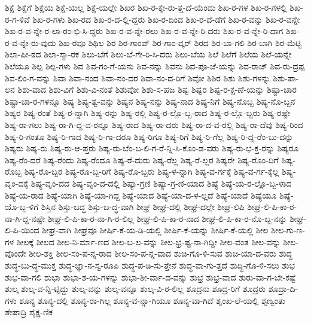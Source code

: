 {ಶಿಕ್ಷೆ
ಶಿಕ್ಷೆಗೆ
ಶಿಕ್ಷೆಯ
ಶಿಕ್ಷೆ-ಯಲ್ಲ
ಶಿಕ್ಷೆ-ಯಲ್ಲೇ
ಶಿಖರ
ಶಿಖ-ರ-ಕ್ಕೇ-ರು-ತ್ತ-ದೆ-ಯೆಂದು
ಶಿಖ-ರ-ಗಳ
ಶಿಖ-ರ-ಗಳಲ್ಲಿ
ಶಿಖ-ರ-ಗ-ಳಿವೆ
ಶಿಖ-ರ-ಗಳು
ಶಿಖ-ರದ
ಶಿಖ-ರ-ದ-ಲ್ಲಿ-ದ್ದರು
ಶಿಖ-ರ-ದಿಂದ
ಶಿಖ-ರ-ದೆ-ಡೆಗೆ
ಶಿಖ-ರ-ವನ್ನು
ಶಿಖ-ರ-ವನ್ನೇ
ಶಿಖ-ರ-ವ-ನ್ನೇ-ರ-ಲಾ-ರಂ-ಭಿ-ಸಿ-ದ್ದರು
ಶಿಖ-ರ-ವ-ನ್ನೇ-ರಲು
ಶಿಖ-ರ-ವ-ನ್ನೇ-ರಿ-ದರು
ಶಿಖ-ರ-ವ-ನ್ನೇ-ರಿ-ದಾಗ
ಶಿಖ-ರ-ವ-ನ್ನೇ-ರು-ವುದು
ಶಿಖ-ರವೂ
ಶಿಥಿಲ
ಶಿರ
ಶಿರ-ಗಾಂವ್
ಶಿರ-ಗಾಂ-ವ್ಕರ್
ಶಿರದ
ಶಿರ-ಬಾ-ಗಲಿ
ಶಿರ-ಬಾಗಿ
ಶಿರ-ಮೆಟ್ಟಿ
ಶಿಲಾ-ಪೀ-ಠದ
ಶಿಲಾ-ಸ್ಮಾ-ರಕ
ಶಿಲು-ಬೆಗೆ
ಶಿಲು-ಬೆ-ಗೇ-ರಿ-ಸಿ-ದರು
ಶಿಲು-ಬೆಯ
ಶಿಲೆ
ಶಿಲೆಗೆ
ಶಿಲೆಯ
ಶಿಲೆ-ಯನ್ನೇ
ಶಿಲೆಯೂ
ಶಿಲ್ಪ
ಶಿಲ್ಪ-ಗಳು
ಶಿವ
ಶಿವ-ಗಂ-ಗೆ-ಯನು
ಶಿವ-ನನ್ನು
ಶಿವನು
ಶಿವ-ಪೂ-ಜೆ-ಯನ್ನು
ಶಿವ-ರಾಜ್
ಶಿವ-ರು-ದ್ರಪ್ಪ
ಶಿವ-ಲಿಂ-ಗ-ವನ್ನು
ಶಿವಾ
ಶಿವಾ-ನಂದ
ಶಿವಾ-ನಂ-ದರ
ಶಿವಾ-ನಂ-ದ-ರಿಗೆ
ಶಿವೋ
ಶಿಶಿರ
ಶಿಶು
ಶಿಶು-ಗಳನ್ನು
ಶಿಶು-ಪಾ-ಲನ
ಶಿಶು-ವಾದ
ಶಿಶು-ವಿಗೆ
ಶಿಶು-ವಿ-ನಂತೆ
ಶಿಶುವೋ
ಶಿಶು-ಸ-ಹಜ
ಶಿಷ್ಟ
ಶಿಷ್ಟರ
ಶಿಷ್ಟ-ರ-ಕ್ಷ-ಣೆ-ಯನ್ನು
ಶಿಷ್ಟಾ-ಚಾರ
ಶಿಷ್ಟಾ-ಚಾ-ರ-ಗಳನ್ನೂ
ಶಿಷ್ಯ
ಶಿಷ್ಯ-ತ್ವ-ವನ್ನು
ಶಿಷ್ಯನ
ಶಿಷ್ಯ-ನನ್ನು
ಶಿಷ್ಯ-ನಾದ
ಶಿಷ್ಯ-ನಿಗೆ
ಶಿಷ್ಯ-ನೊಬ್ಬ
ಶಿಷ್ಯ-ನೊ-ಬ್ಬನ
ಶಿಷ್ಯರ
ಶಿಷ್ಯ-ರಂತೆ
ಶಿಷ್ಯ-ರ-ನ್ನಾಗಿ
ಶಿಷ್ಯ-ರನ್ನು
ಶಿಷ್ಯ-ರಲ್ಲಿ
ಶಿಷ್ಯ-ರ-ಲ್ಲೊ-ಬ್ಬ-ರಾದ
ಶಿಷ್ಯ-ರ-ಲ್ಲೊ-ಬ್ಬರು
ಶಿಷ್ಯ-ರಷ್ಟೇ
ಶಿಷ್ಯ-ರಾ-ಗಲು
ಶಿಷ್ಯ-ರಾ-ಗಿ-ದ್ದ-ವ-ರನ್ನೂ
ಶಿಷ್ಯ-ರಾದ
ಶಿಷ್ಯ-ರಾ-ದರು
ಶಿಷ್ಯ-ರಾ-ದ-ವ-ರಲ್ಲಿ
ಶಿಷ್ಯ-ರಾ-ದೆವು
ಶಿಷ್ಯ-ರಿಂದ
ಶಿಷ್ಯ-ರಿ-ಗಂತೂ
ಶಿಷ್ಯ-ರಿ-ಗಾದ
ಶಿಷ್ಯ-ರಿ-ಗಾ-ದರೂ
ಶಿಷ್ಯ-ರಿಗೂ
ಶಿಷ್ಯ-ರಿಗೆ
ಶಿಷ್ಯ-ರಿ-ಗೆಲ್ಲ
ಶಿಷ್ಯ-ರಿ-ದ್ದ-ರೆಂ-ಬು-ದನ್ನು
ಶಿಷ್ಯರು
ಶಿಷ್ಯ-ರು
ಶಿಷ್ಯ-ರು-ಆ-ಪ್ತರು
ಶಿಷ್ಯ-ರು-ಬೆಂ-ಬ-ಲಿ-ಗ-ರೆ-ನ್ನಿ-ಸಿ-ಕೊಂ-ಡ-ವರು
ಶಿಷ್ಯ-ರು-ಭ-ಕ್ತ-ರನ್ನು
ಶಿಷ್ಯರೂ
ಶಿಷ್ಯ-ರೆಂ-ದರೆ
ಶಿಷ್ಯ-ರೆಂದು
ಶಿಷ್ಯ-ರೆಂದೂ
ಶಿಷ್ಯ-ರೆ-ದುರು
ಶಿಷ್ಯ-ರೆಲ್ಲ
ಶಿಷ್ಯ-ರೆ-ಲ್ಲರ
ಶಿಷ್ಯರೇ
ಶಿಷ್ಯ-ರೊಂ-ದಿಗೆ
ಶಿಷ್ಯ-ರೊಬ್ಬ
ಶಿಷ್ಯ-ರೊ-ಬ್ಬರ
ಶಿಷ್ಯ-ರೊ-ಬ್ಬ-ರಿಗೆ
ಶಿಷ್ಯ-ರೊ-ಬ್ಬರು
ಶಿಷ್ಯ-ಳ-ನ್ನಾಗಿ
ಶಿಷ್ಯ-ವ-ರ್ಗಕ್ಕೆ
ಶಿಷ್ಯ-ವ-ರ್ಗ-ಕ್ಕೆಲ್ಲ
ಶಿಷ್ಯ-ವೃಂ-ದಕ್ಕೆ
ಶಿಷ್ಯ-ವೃಂ-ದದ
ಶಿಷ್ಯ-ವೃಂ-ದ-ದಲ್ಲಿ
ಶಿಷ್ಯಾ-ಗ್ರಣಿ
ಶಿಷ್ಯಾ-ಗ್ರ-ಣಿ-ಯಾದ
ಶಿಷ್ಯೆ
ಶಿಷ್ಯೆ-ಯ-ರ-ಲ್ಲೊ-ಬ್ಬ-ಳಾದ
ಶಿಷ್ಯೆ-ಯ-ರಾದ
ಶಿಷ್ಯೆ-ಯಾಗಿ
ಶಿಷ್ಯೆ-ಯಾ-ಗಿದ್ದ
ಶಿಷ್ಯೆ-ಯಾದ
ಶಿಷ್ಯೆ-ಯಾ-ದ-ಳ-ಲ್ಲದೆ
ಶಿಷ್ಯೆ-ಯಾದೆ
ಶಿಷ್ಯೆಯೂ
ಶಿಷ್ಯೆ-ಯೊ-ಬ್ಬ-ಳಿಗೆ
ಶಿಸ್ತಿನ
ಶಿಸ್ತು-ಬದ್ಧ
ಶಿಸ್ತು-ಬ-ದ್ಧ-ವಾಗಿ
ಶೀಘ್ರ
ಶೀಘ್ರ-ದಲ್ಲಿ
ಶೀಘ್ರ-ದಲ್ಲೇ
ಶೀಘ್ರ-ಲಿಪಿ
ಶೀಘ್ರ-ಲಿ-ಪಿ-ಕಾ-ರ-ನಾ-ಗಿ-ದ್ದ-ನಷ್ಟೇ
ಶೀಘ್ರ-ಲಿ-ಪಿ-ಕಾ-ರ-ನಾ-ಗಿ-ರ-ಲಿಲ್ಲ
ಶೀಘ್ರ-ಲಿ-ಪಿ-ಕಾ-ರ-ನಾದ
ಶೀಘ್ರ-ಲಿ-ಪಿ-ಕಾ-ರ-ನೊ-ಬ್ಬ-ನನ್ನು
ಶೀಘ್ರ-ಲಿ-ಪಿ-ಯಿಂದ
ಶೀಘ್ರ-ವಾಗಿ
ಶೀಘ್ರವೂ
ಶೀರ್ಷಿ-ಕೆ-ಯ-ಡಿ-ಯಲ್ಲಿ
ಶೀರ್ಷಿ-ಕೆ-ಯನ್ನು
ಶೀರ್ಷಿ-ಕೆ-ಯಲ್ಲಿ
ಶೀಲ
ಶೀಲ-ಗು-ಣ-ಗಳ
ಶೀಲಕ್ಕೆ
ಶೀಲದ
ಶೀಲ-ನಿ-ರ್ಮಾ-ಣದ
ಶೀಲ-ಬ-ಲ-ವನ್ನು
ಶೀಲ-ಭ್ರ-ಷ್ಟ-ನಾ-ಗಿದ್ದೀ
ಶೀಲ-ವಂತ
ಶೀಲ-ವನ್ನು
ಶೀಲ-ವೊಂದೇ
ಶೀಲ-ಶಕ್ತಿ
ಶೀಲ-ಸಂ-ಪ-ನ್ನ-ರಾದ
ಶೀಲ-ಸಂ-ಪ-ನ್ನ-ವಾದ
ಶುಚಿ-ಗೊ-ಳಿ-ಸುವ
ಶುಚಿ-ಯಾ-ದ-ವರು
ಶುದ್ಧ
ಶುದ್ಧ-ಬು-ದ್ಧ-ಮುಕ್ತ
ಶುದ್ಧ-ಜ್ಞಾ-ನ-ಸ್ವ-ರೂಪಿ
ಶುದ್ಧ-ಪ-ಡಿ-ಸು-ತ್ತೇನೆ
ಶುದ್ಧ-ವಾ-ಗು-ತ್ತದೆ
ಶುದ್ಧಿ-ಗೊ-ಳಿ-ಸಲು
ಶುಭ
ಶುಭ-ವಾ-ಗಲಿ
ಶುಭಾ
ಶುಭಾ-ಶ-ಯ-ಗಳನ್ನು
ಶುಭಾ-ಶೀ-ರ್ವಾ-ದ-ವನ್ನು
ಶುಭ್ರ
ಶುಭ್ರ-ವಾದ
ಶುರು-ವಾ-ಗ-ಬೇ-ಕಷ್ಟೆ
ಶುಲ್ಕ
ಶುಲ್ಕ-ವ-ನ್ನಿ-ಟ್ಟಿದ್ದು
ಶುಲ್ಕ-ವನ್ನು
ಶುಲ್ಕ-ವನ್ನೂ
ಶುಲ್ಕ-ವಿ-ರ-ಲಿಲ್ಲ
ಶೂದ್ರನು
ಶೂದ್ರ-ರಿಗೆ
ಶೂದ್ರರು
ಶೂದ್ರಾ-ದಿ-ಗಳು
ಶೂನ್ಯ
ಶೂನ್ಯ-ದಲ್ಲಿ
ಶೂನ್ಯ-ರಾ-ಗಿಲ್ಲ
ಶೂನ್ಯ-ವ-ನ್ನಾ-ಗಿಯೂ
ಶೂನ್ಯ-ವಾ-ಗಿದೆ
ಶೃಂಖ-ಲೆ-ಯಲ್ಲಿ
ಶೃಣ್ವಂತು
ಶೇಷಾದ್ರಿ
ಶೈಕ್ಷ-ಣಿಕ
}
